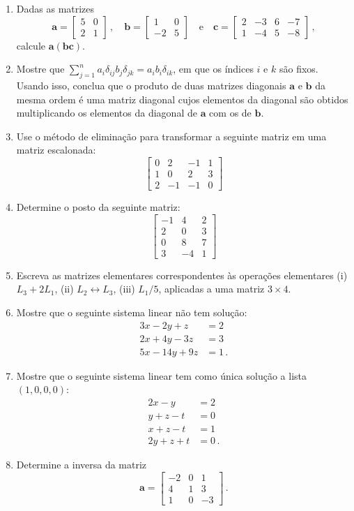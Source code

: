 \documentclass[12pt,a4paper]{article}
\newcommand{\mb}{\mathbf}
\begin{document}
\begin{enumerate}
  \item Dadas as matrizes
  $$\mb a=\begin{bmatrix}
    5&0\\
    2&1
  \end{bmatrix}\,,\quad \mb b=\begin{bmatrix}
    1&0\\
    -2&5
  \end{bmatrix}\quad\text{e}\quad \mb c=\begin{bmatrix}
    2&-3&6&-7\\
    1&-4&5&-8
  \end{bmatrix}\,,$$
  calcule $\mb a(\mb{bc})$.
  \item Mostre que $\sum_{j=1}^na_i\delta_{ij}b_j\delta_{jk}=a_ib_i\delta_{ik}$, em que os índices $i$ e $k$ são fixos. Usando isso, conclua que o produto de duas matrizes diagonais $\mb a$ e $\mb b$ da mesma ordem é uma matriz diagonal cujos elementos da diagonal são obtidos multiplicando os elementos da diagonal de $\mb a$ com os de $\mb b$.
  \item Use o método de eliminação para transformar a seguinte matriz em uma matriz escalonada:
  $$\begin{bmatrix}
    0&2&-1&1\\
    1&0&2&3\\
    2&-1&-1&0
  \end{bmatrix}$$
  \item Determine o posto da seguinte matriz:
  $$\begin{bmatrix}
    -1&4&2\\
    2&0&3\\
    0&8&7\\
    3&-4&1
  \end{bmatrix}$$
  \item Escreva as matrizes elementares correspondentes às operações elementares (i) $L_3+2L_1$, (ii) $L_2\leftrightarrow L_3$, (iii) $L_1/5$, aplicadas a uma matriz $3\times 4$.
  \item Mostre que o seguinte sistema linear não tem solução:
  \begin{equation*}
    \begin{split}
      3x-2y+z&=2\\
      2x+4y-3z&=3\\
      5x-14y+9z&=1\,.
    \end{split}
  \end{equation*}
  \item Mostre que o seguinte sistema linear tem como única solução a lista $(1,0,0,0)$:
  \begin{equation*}
    \begin{split}
      2x-y&=2\\
      y+z-t&=0\\
      x+z-t&=1\\
      2y+z+t&=0\,.
    \end{split}
  \end{equation*}
  \item Determine a inversa da matriz
  $$\mb a=\begin{bmatrix}
    -2&0&1\\
    4&1&3\\
    1&0&-3
  \end{bmatrix}\,.$$
\end{enumerate}
\end{document}
